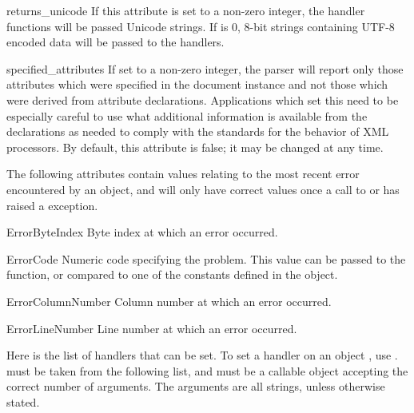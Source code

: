 \begin{memberdesc}[xmlparser]{returns_unicode} 
If this attribute is set to a non-zero integer, the handler functions
will be passed Unicode strings.  If  is 0,
8-bit strings containing UTF-8 encoded data will be passed to the
handlers.
\end{memberdesc}

\begin{memberdesc}[xmlparser]{specified_attributes}
If set to a non-zero integer, the parser will report only those
attributes which were specified in the document instance and not those
which were derived from attribute declarations.  Applications which
set this need to be especially careful to use what additional
information is available from the declarations as needed to comply
with the standards for the behavior of XML processors.  By default,
this attribute is false; it may be changed at any time.
\end{memberdesc}

The following attributes contain values relating to the most recent
error encountered by an  object, and will only have
correct values once a call to  or 
has raised a  exception.

\begin{memberdesc}[xmlparser]{ErrorByteIndex} 
Byte index at which an error occurred.
\end{memberdesc} 

\begin{memberdesc}[xmlparser]{ErrorCode} 
Numeric code specifying the problem.  This value can be passed to the
 function, or compared to one of the constants
defined in the  object.
\end{memberdesc}

\begin{memberdesc}[xmlparser]{ErrorColumnNumber} 
Column number at which an error occurred.
\end{memberdesc}

\begin{memberdesc}[xmlparser]{ErrorLineNumber}
Line number at which an error occurred.
\end{memberdesc}

Here is the list of handlers that can be set.  To set a handler on an
 object , use
.   must
be taken from the following list, and  must be a callable
object accepting the correct number of arguments.  The arguments are
all strings, unless otherwise stated.


